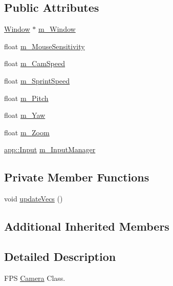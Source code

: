 \subsection*{Public Attributes}
\begin{DoxyCompactItemize}
\item 
\hyperlink{classspork_1_1graphics_1_1_window}{Window} $\ast$ \hyperlink{classspork_1_1graphics_1_1_f_p_scamera_a99dc80d4b47f19fc04a8f15a57f56be8}{m\+\_\+\+Window}
\item 
float \hyperlink{classspork_1_1graphics_1_1_f_p_scamera_aa8a6e818b2f9ed500ce55f5ca01dda01}{m\+\_\+\+Mouse\+Sensitivity}
\item 
float \hyperlink{classspork_1_1graphics_1_1_f_p_scamera_a49bc957017b3bef9c3a9828da4b765d4}{m\+\_\+\+Cam\+Speed}
\item 
float \hyperlink{classspork_1_1graphics_1_1_f_p_scamera_ac44f6774093c387176be47507379042c}{m\+\_\+\+Sprint\+Speed}
\item 
float \hyperlink{classspork_1_1graphics_1_1_f_p_scamera_abe9d37f1ce76837fe9691aaa2aa1f701}{m\+\_\+\+Pitch}
\item 
float \hyperlink{classspork_1_1graphics_1_1_f_p_scamera_a74908a13a0a9d3851329ffb6535e3676}{m\+\_\+\+Yaw}
\item 
float \hyperlink{classspork_1_1graphics_1_1_f_p_scamera_a1fe881e57b62ea7a8f9846252ba2d9b9}{m\+\_\+\+Zoom}
\item 
\hyperlink{classspork_1_1app_1_1_input}{app\+::\+Input} \hyperlink{classspork_1_1graphics_1_1_f_p_scamera_aa2d52e27ed5c4ace5efd402917a457dd}{m\+\_\+\+Input\+Manager}
\end{DoxyCompactItemize}
\subsection*{Private Member Functions}
\begin{DoxyCompactItemize}
\item 
void \hyperlink{classspork_1_1graphics_1_1_f_p_scamera_a9005e9b97702e93b55dbd5f32988ce6f}{update\+Vecs} ()
\end{DoxyCompactItemize}
\subsection*{Additional Inherited Members}


\subsection{Detailed Description}
F\+PS \hyperlink{classspork_1_1graphics_1_1_camera}{Camera} Class. 

